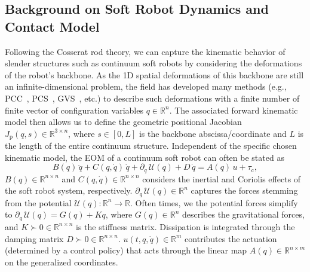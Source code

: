 \subsection{Background on Soft Robot Dynamics and Contact Model}
Following the Cosserat rod theory, we can capture the kinematic behavior of slender structures such as continuum soft robots by considering the deformations of the robot's backbone. As the 1D spatial deformations of this backbone are still an infinite-dimensional problem, the field has developed many methods (e.g., \gls{PCC}~\citep{webster2010design}, \gls{PCS}~\citep{renda2018discrete}, \gls{GVS}~\citep{renda2020geometric}, etc.) to describe such deformations with a finite number of finite vector of configuration variables $q \in \mathbb{R}^n$. The associated forward kinematic model then allows us to define the geometric positional Jacobian $J_\mathrm{p}(q, s) \in \mathbb{R}^{3 \times n}$, where $s \in [0,L]$ is the backbone abscissa/coordinate and $L$ is the length of the entire continuum structure.
Independent of the specific chosen kinematic model, the \gls{EOM} of a continuum soft robot can often be stated as~\citep{armanini2023soft, della2023model}
\begin{equation}\label{eq:safetymetric:soft_robot_configuration_space_dynamics}
    B(q) \, \ddot{q} + C(q, \dot{q}) \, \dot{q} + \partial_{q} \, \mathcal{U}(q) + D \, \dot{q} = A(q) \, u + \tau_\mathrm{c},
\end{equation}
$B(q) \in \mathbb{R}^{n \times n}$ and $C(q, \dot{q}) \in \mathbb{R}^{n \times n}$ considers the inertial and Coriolis effects of the soft robot system, respectively.
$\partial_{q} \, \mathcal{U}(q) \in \mathbb{R}^n$ captures the forces stemming from the potential $\mathcal{U}(q): \mathbb{R}^n \to \mathbb{R}$.
Often times, we the potential forces simplify to $\partial_{q} \, \mathcal{U}(q) =  G(q) + K q$, where $G(q) \in \mathbb{R}^{n}$ describes the gravitational forces, and $K \succ 0 \in \mathbb{R}^{n \times n}$ is the stiffness matrix.
Dissipation is integrated through the damping matrix $D \succ 0 \in \mathbb{R}^{n \times n}$.
$u(t,q,\dot{q}) \in \mathbb{R}^{m}$ contributes the actuation (determined by a control policy) that acts through the linear map $A(q) \in \mathbb{R}^{n \times m}$ on the generalized coordinates.


